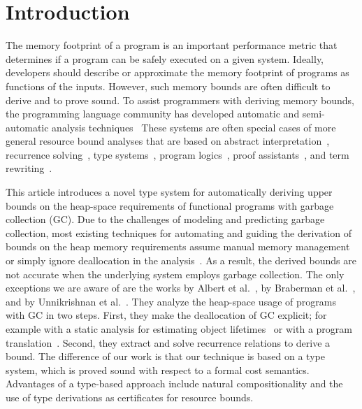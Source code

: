 \documentclass{easychair}
\theoremstyle{definition}
\begin{document}
\section{Introduction}
\label{sect:introduction}
The memory footprint of a program is an important performance metric
that determines if a program can be safely executed on a given
system. Ideally, developers should describe or approximate the memory
footprint of programs as functions of the inputs. However, such memory
bounds are often difficult to derive and to prove sound.
%
To assist programmers with deriving memory bounds, the programming
language community has developed automatic and semi-automatic analysis
techniques~\cite{Jost03,Chin08,Albert07b}
%
These systems are often special cases of more general resource bound
analyses that are based on abstract
interpretation~\cite{GulwaniMC09,BlancHHK10,SinnZV14},
recurrence
solving~\cite{FloresH14,AlbertFR15,DannerLR15,KincaidBBR2017}, type
systems~\cite{Jost10,HoffmannW15,LagoG11,CicekBGGH16,OOPSLA:WWC17,DasHP18},
program logics~\cite{Atkey10,CarbonneauxHZ15,CarbonneauxHRS17,Radicek17}, proof
assistants~\cite{Nipkow15,ChargueraudP15}, and term
rewriting~\cite{AvanziniM13,NoschinskiEG13,FrohnNHBG16}.

This article introduces a novel type system for automatically deriving
upper bounds on the heap-space requirements of functional programs
with garbage collection (GC).
%
Due to the challenges of modeling and predicting garbage collection,
most existing techniques for automating and guiding the derivation of
bounds on the heap memory requirements assume manual memory management
or simply ignore deallocation in the
analysis~\cite{Jost03,Jost06,SimoesVFJH12,Chin05,Chin08,Albert07b}. As
a result, the derived bounds are not accurate when the underlying
system employs garbage collection. The only exceptions we are aware of
are the works by Albert et al.~\cite{Albert09,Albert13}, by Braberman
et al.~\cite{Braberman08}, and by Unnikrishnan et
al.~\cite{UnnikrishnanSL03,Unnikrishnan09}. They analyze the
heap-space usage of programs with GC in two steps. First, they make
the deallocation of GC explicit; for example with a static analysis
for estimating object lifetimes~\cite{Albert13} or with a program
translation~\cite{Unnikrishnan09}. Second, they extract and solve
recurrence relations to derive a bound. The difference of our work is
that our technique is based on a type system, which is proved sound
with respect to a formal cost semantics. Advantages of a type-based
approach include natural compositionality and the use of type
derivations as certificates for resource bounds.
\end{document}
